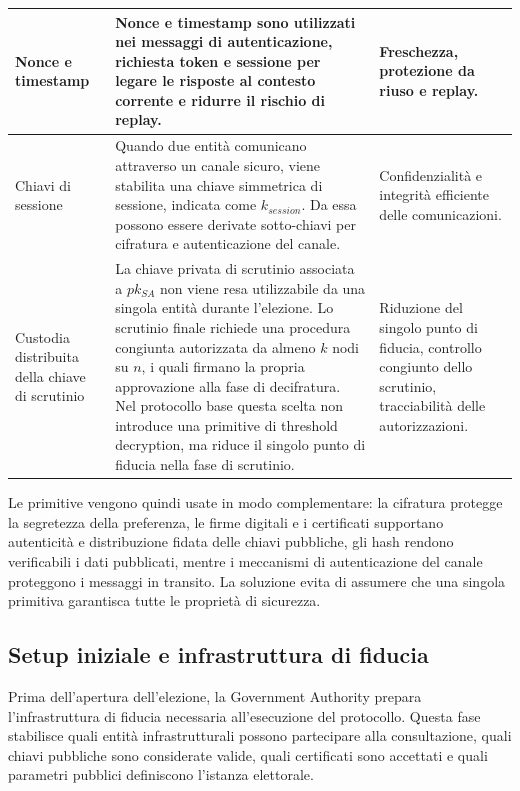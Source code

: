 \documentclass[a4paper,12pt]{article}
\begin{document}
\begin{longtable}{|>{\raggedright\arraybackslash}p{}|>{\raggedright\arraybackslash}p{}|>{\raggedright\arraybackslash}p{}|}
	Nonce e timestamp &
	Nonce e timestamp sono utilizzati nei messaggi di autenticazione, richiesta token e sessione per legare le risposte al contesto corrente e ridurre il rischio di replay. &
	Freschezza, protezione da riuso e replay. \\
	\hline

	Chiavi di sessione &
	Quando due entit\`a comunicano attraverso un canale sicuro, viene stabilita una chiave simmetrica di sessione, indicata come \(k_{session}\). Da essa possono essere derivate sotto-chiavi per cifratura e autenticazione del canale. &
	Confidenzialit\`a e integrit\`a efficiente delle comunicazioni. \\
	\hline

	Custodia distribuita della chiave di scrutinio &
    La chiave privata di scrutinio associata a \(pk_{SA}\) non viene resa utilizzabile da una singola entit\`a durante l'elezione. 
    Lo scrutinio finale richiede una procedura congiunta autorizzata da almeno \(k\) nodi su \(n\), i quali firmano la propria approvazione alla fase di decifratura. 
    Nel protocollo base questa scelta non introduce una primitive di threshold decryption, ma riduce il singolo punto di fiducia nella fase di scrutinio. &
    Riduzione del singolo punto di fiducia, controllo congiunto dello scrutinio, tracciabilit\`a delle autorizzazioni. \\
	\hline
\end{longtable}

Le primitive vengono quindi usate in modo complementare: la cifratura protegge la segretezza della preferenza, le firme digitali e i certificati supportano autenticit\`a e distribuzione fidata delle chiavi pubbliche, gli hash rendono verificabili i dati pubblicati, mentre i meccanismi di autenticazione del canale proteggono i messaggi in transito. 
La soluzione evita di assumere che una singola primitiva garantisca tutte le propriet\`a di sicurezza.

\subsection{Setup iniziale e infrastruttura di fiducia}

Prima dell'apertura dell'elezione, la Government Authority prepara l'infrastruttura di fiducia necessaria all'esecuzione del protocollo. 
Questa fase stabilisce quali entit\`a infrastrutturali possono partecipare alla consultazione, quali chiavi pubbliche sono considerate valide, quali certificati sono accettati e quali parametri pubblici definiscono l'istanza elettorale.
\end{document}
